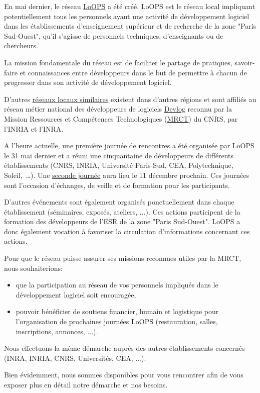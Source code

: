 En mai dernier, le réseau \href{https://reseau-loops.github.com/}{LoOPS}
a été créé. LoOPS est le réseau local
impliquant potentiellement tous les personnels ayant une activité de
développement logiciel dans les établissements d'enseignement supérieur
et de recherche de la zone "Paris Sud-Ouest", qu'il s'agisse de personnels
techniques, d'enseignants ou de chercheurs.

La mission fondamentale du réseau est de faciliter le partage de pratiques,
savoir-faire et connaissances entre développeurs dans le but de permettre à
chacun de progresser dans son activité de développement logiciel.

D'autres \href{http://devlog.cnrs.fr/region}{réseaux locaux similaires} existent dans d'autres régions
et sont affiliés au réseau métier national des développeurs de logiciels
\href{http://devlog.cnrs.fr}{Devlog} reconnu par la Mission Ressources et Compétences Technologiques
(\href{http://www.mrct.cnrs.fr/}{MRCT}) du CNRS, par l'INRIA et l'INRA.

A l'heure actuelle, une
\href{https://reseau-loops.github.com/journee\_2012\_05\_31.html}{première journée}
de rencontres a été organisée par
LoOPS le 31 mai dernier et a réuni une cinquantaine de développeurs de
différents établissements (CNRS, INRIA, Université Paris-Sud, CEA,
Polytechnique, Soleil,~\dots).
Une \href{https://reseau-loops.github.com/journee\_2012\_12.html}{seconde journée} aura lieu le 11 décembre
prochain. Ces journées sont l'occasion d'échanges, de veille et de
formation pour les participants.

D'autres événements sont également organisés ponctuellement dans chaque
établissement (séminaires, exposés, ateliers, ...). Ces actions participent
de la formation des développeurs de l'ESR de la zone "Paris Sud-Ouest". LoOPS
a donc également vocation à favoriser la circulation d'informations concernant
ces actions.

Pour que le réseau puisse assurer ses missions reconnues utiles par la MRCT,
nous souhaiterions:
\begin{itemize}
\item que la participation au réseau de vos personnels impliqués dans le
  développement logiciel soit encouragée,
\item pouvoir bénéficier de soutiens financier, humain et logistique pour
  l'organisation de prochaines journées LoOPS (restauration, salles,
  inscriptions, annonces, ...).
\end{itemize}

Nous effectuons la même démarche auprès des autres établissements concernés
(INRA, INRIA, CNRS, Universités, CEA, ...).

Bien évidemment, nous sommes disponibles pour vous rencontrer afin de vous
exposer plus en détail notre démarche et nos besoins.
